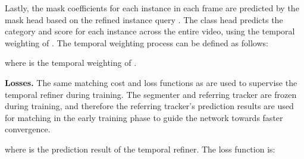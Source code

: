 \documentclass[10pt,twocolumn,letterpaper]{article}
\begin{document}
Lastly, the mask coefficients for each instance in each frame are predicted by the mask head based on the refined instance query . The class head predicts the category and score for each instance across the entire video, using the temporal weighting of . The temporal weighting process can be defined as follows:

where  is the temporal weighting of .

\textbf{Losses.} The same matching cost and loss functions as \cite{mask2formervis} are used to supervise the temporal refiner during training. The segmenter and referring tracker are frozen during training, and therefore the referring tracker's prediction results are used for matching in the early training phase to guide the network towards faster convergence.

where  is the prediction result of the temporal refiner. The loss function is:
\end{document}
